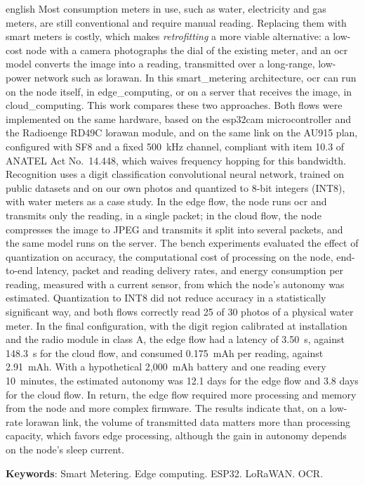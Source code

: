 \begin{resumo}[Abstract]
 \begin{otherlanguage*}{english}
    Most consumption meters in use, such as water, electricity and gas meters, are still
    conventional and require manual reading. Replacing them with smart meters is costly,
    which makes \textit{\gls{retrofitting}} a more viable alternative: a low-cost node with a
    camera photographs the dial of the existing meter, and an \gls{ocr} model converts the
    image into a reading, transmitted over a long-range, low-power network such as
    \gls{lorawan}. In this \gls{smart_metering} architecture, \gls{ocr} can run on the node
    itself, in \gls{edge_computing}, or on a server that receives the image, in
    \gls{cloud_computing}. This work compares these two approaches. Both flows were
    implemented on the same hardware, based on the \gls{esp32cam} microcontroller and the
    Radioenge RD49C \gls{lorawan} module, and on the same link on the AU915 plan, configured
    with SF8 and a fixed 500~kHz channel, compliant with item 10.3 of ANATEL Act
    No.~14.448, which waives frequency hopping for this bandwidth. Recognition uses a digit classification convolutional neural network,
    trained on public datasets and on our own photos and quantized to 8-bit integers (INT8),
    with water meters as a case study. In the edge flow, the node runs \gls{ocr} and
    transmits only the reading, in a single packet; in the cloud flow, the node compresses
    the image to JPEG and transmits it split into several packets, and the same model runs
    on the server. The bench experiments evaluated the effect of quantization on accuracy,
    the computational cost of processing on the node, end-to-end latency, packet and
    reading delivery rates, and energy consumption per reading, measured with a current
    sensor, from which the node's autonomy was estimated. Quantization to INT8 did not
    reduce accuracy in a statistically significant way, and both flows correctly read 25 of 30 photos of a physical water
    meter. In the final configuration, with the digit region calibrated at installation and
    the radio module in class A, the edge flow had a latency of 3.50~s, against 148.3~s
    for the cloud flow, and consumed 0.175~mAh per reading, against 2.91~mAh. With a
    hypothetical 2,000~mAh battery and one reading every 10~minutes, the estimated autonomy
    was 12.1 days for the edge flow and 3.8 days for the cloud flow. In return, the edge flow
    required more processing and memory from the node and more complex firmware. The results
    indicate that, on a low-rate \gls{lorawan} link, the volume of transmitted data matters
    more than processing capacity, which favors edge processing, although the gain in
    autonomy depends on the node's sleep current.

  \vspace{\onelineskip}
  \noindent
  \textbf{Keywords}: Smart Metering. Edge computing. ESP32. LoRaWAN. OCR.
 \end{otherlanguage*}
\end{resumo}
